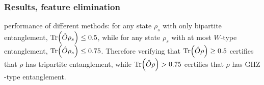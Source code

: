 \documentclass[
aps,
pra,
floatfix,
]{revtex4-2}
\theoremstyle{plain}
\theoremstyle{definition}
\newcommand{\ghz}{\text{GHZ}}
\newcommand{\ob}{\hat{O}}
\newcommand{\dm}{\rho}
\begin{document}
\subsubsection{Results, feature elimination}
performance of different methods: 
for any state $\dm_s$ with only bipartite entanglement, $\Tr(\ob \dm_s)\le 0.5$, 
while for any state $\dm_s$ with at most $W$-type entanglement, $\Tr(\ob \dm_s)\le 0.75$.
Therefore verifying that $\Tr(\ob \dm)\ge 0.5$ certifies that $\dm$ has tripartite entanglement, while $\Tr(\ob \dm)> 0.75$ certifies that $\dm$ has $\ghz$-type entanglement. \cite{acinClassificationMixedThreequbit2001}
\end{document}
